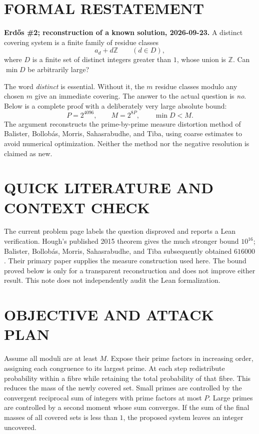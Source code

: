 \section{FORMAL RESTATEMENT}
\textbf{Erd\H{o}s \#2; reconstruction of a known solution, 2026-09-23.}
A distinct covering system is a finite family of residue classes
\[
 a_d+d\mathbb Z\qquad(d\in D),
\]
where $D$ is a finite set of distinct integers greater than $1$, whose union is $\mathbb Z$. Can $\min D$ be arbitrarily large?

The word \emph{distinct} is essential. Without it, the $m$ residue classes modulo any chosen $m$ give an immediate covering. The answer to the actual question is \emph{no}. Below is a complete proof with a deliberately very large absolute bound:
\[
 P=2^{4096},\qquad M=2^{8P},\qquad \min D<M.
\]
The argument reconstructs the prime-by-prime measure distortion method of Balister, Bollob\'as, Morris, Sahasrabudhe, and Tiba, using coarse estimates to avoid numerical optimization. Neither the method nor the negative resolution is claimed as new.

\section{QUICK LITERATURE AND CONTEXT CHECK}
The current problem page labels the question disproved and reports a Lean verification. Hough's published 2015 theorem gives the much stronger bound $10^{16}$; Balister, Bollob\'as, Morris, Sahasrabudhe, and Tiba subsequently obtained $616000$. Their primary paper supplies the measure construction used here. The bound proved below is only for a transparent reconstruction and does not improve either result. This note does not independently audit the Lean formalization.

\section{OBJECTIVE AND ATTACK PLAN}
Assume all moduli are at least $M$. Expose their prime factors in increasing order, assigning each congruence to its largest prime. At each step redistribute probability within a fibre while retaining the total probability of that fibre. This reduces the mass of the newly covered set. Small primes are controlled by the convergent reciprocal sum of integers with prime factors at most $P$. Large primes are controlled by a second moment whose sum converges. If the sum of the final masses of all covered sets is less than $1$, the proposed system leaves an integer uncovered.

